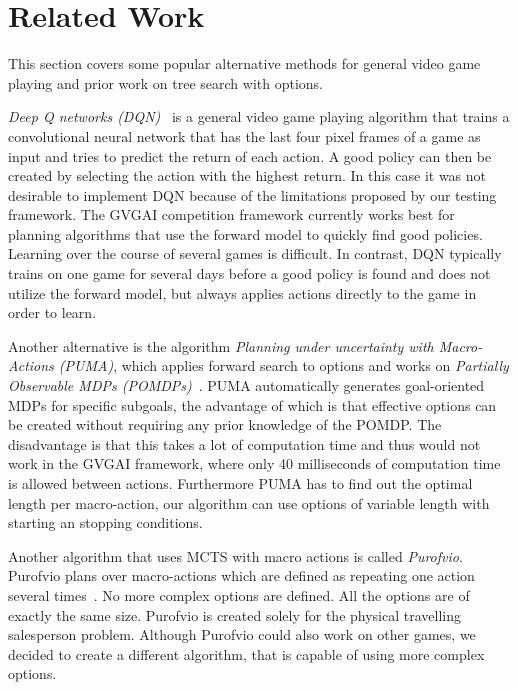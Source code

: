 \section{Related Work}
\label{sec:related}
This section covers some popular alternative methods for general video game
playing and prior work on tree search with options. 

\emph{Deep Q networks (DQN)}~\cite{mnih2013playing} is a general video game playing algorithm that
trains a convolutional neural network that has the last four pixel frames of a
game as input and tries to predict the return of each action. A good policy can
then be created by selecting the action with the highest return. In this case it
was not desirable to implement DQN because of the limitations proposed by our
testing framework.  The GVGAI competition framework currently works best for
planning algorithms that use the forward model to quickly find good policies.
Learning over the course of several games is difficult. In contrast, DQN
typically trains on one game for several days before a good policy is found and
does not utilize the forward model, but always applies actions directly to the
game in order to learn.

Another alternative is the algorithm \emph{Planning under uncertainty with
Macro-Actions (PUMA)}, which applies forward search to options and works on
\emph{Partially Observable MDPs (POMDPs)}~\cite{he2010puma}. PUMA automatically
generates goal-oriented MDPs for specific subgoals, the advantage of which is
that effective options can be created without requiring any prior knowledge of
the POMDP\@. The disadvantage is that this takes a lot of computation time and
thus would not work in the GVGAI framework, where only 40 milliseconds of
computation time is allowed between actions. Furthermore PUMA has to find out
the optimal length per macro-action, our algorithm can use options of variable
length with starting an stopping conditions.

Another algorithm that uses MCTS with macro actions is called \emph{Purofvio}.
Purofvio plans over macro-actions which are defined as repeating one action
several times~\cite{powley2012monte}. No more complex options are defined.  All the options are of
exactly the same size. Purofvio is created solely for the physical travelling
salesperson problem. Although Purofvio could also work on other games, we
decided to create a different algorithm, that is capable of using more complex
options.
